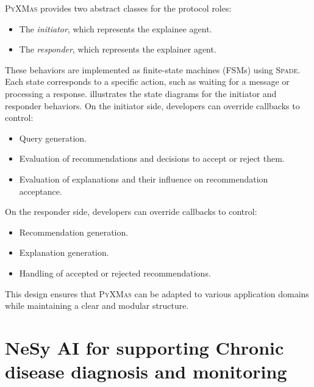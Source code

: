 %
\textsc{PyXMas} provides two abstract classes for the protocol roles:
%
\begin{itemize}
    \item The \emph{initiator}, which represents the explainee agent.
    \item The \emph{responder}, which represents the explainer agent.
\end{itemize}
%
These behaviors are implemented as finite-state machines (FSMs) using \textsc{Spade}.
%
Each state corresponds to a specific action, such as waiting for a message or processing a response.
%
 illustrates the state diagrams for the initiator and responder behaviors.
%
On the initiator side, developers can override callbacks to control:
%
\begin{itemize}
    \item Query generation.
    \item Evaluation of recommendations and decisions to accept or reject them.
    \item Evaluation of explanations and their influence on recommendation acceptance.
\end{itemize}
%
On the responder side, developers can override callbacks to control:
%
\begin{itemize}
    \item Recommendation generation.
    \item Explanation generation.
    \item Handling of accepted or rejected recommendations.
\end{itemize}
%
This design ensures that \textsc{PyXMas} can be adapted to various application domains while maintaining a clear and modular structure.


\section[\Gls{NeSy} \Gls{AI} for disease diagnosis and monitoring]{\Gls{NeSy} \gls{AI} for supporting Chronic disease diagnosis and monitoring}
\label{sec:nesy-ai-for-supporting-chronic-disease-diagnosis-and-monitoring}
%
